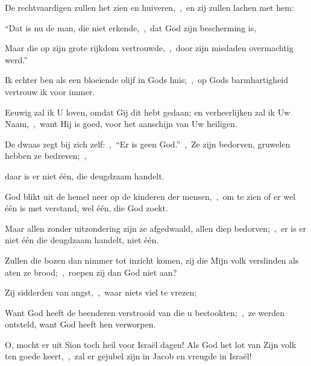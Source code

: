 \documentclass[12pt,twoside,a5paper]{article}
\begin{document}

\begin{halfparskip}
  De rechtvaardigen zullen het zien en huiveren,~\sep\ en zij zullen lachen met hem:

  ``Dat is nu de man, die niet erkende,~\sep\ dat God zijn bescherming is,

  Maar die op zijn grote rijkdom vertrouwde,~\sep\ door zijn misdaden overmachtig werd.''

  Ik echter ben als een bloeiende olijf in Gods huis;~\sep\ op Gods barmhartigheid vertrouw ik voor immer.

  Eeuwig zal ik U loven, omdat Gij dit hebt gedaan; en verheerlijken zal ik Uw Naam,~\sep\ want Hij is goed, voor het aanschijn van Uw heiligen.
\end{halfparskip}





\begin{halfparskip}
  De dwaas zegt bij zich zelf:~\sep\ ``Er is geen God.''~\sep\ Ze zijn bedorven, gruwelen hebben ze bedreven;~\sep


  daar is er niet één, die deugdzaam handelt.

  God blikt uit de hemel neer op de kinderen der mensen,~\sep\ om te zien of er wel één is met verstand, wel één, die God zoekt.

  Maar allen zonder uitzondering zijn ze afgedwaald, allen diep bedorven;~\sep\ er is er niet één die deugdzaam handelt, niet één.
\end{halfparskip}


\begin{halfparskip}
  Zullen die bozen dan nimmer tot inzicht komen, zij die Mijn volk verslinden als aten ze brood;~\sep\ roepen zij dan God niet aan?

  Zij sidderden van angst,~\sep\ waar niets viel te vrezen;

  Want God heeft de beenderen verstrooid van die u bestookten;~\sep\ ze werden ontsteld, want God heeft hen verworpen.

  O, mocht er uit Sion toch heil voor Israël dagen! Als God het lot van Zijn volk ten goede keert,~\sep\ zal er gejubel zijn in Jacob en vreugde in Israël!
\end{halfparskip}
\end{document}
